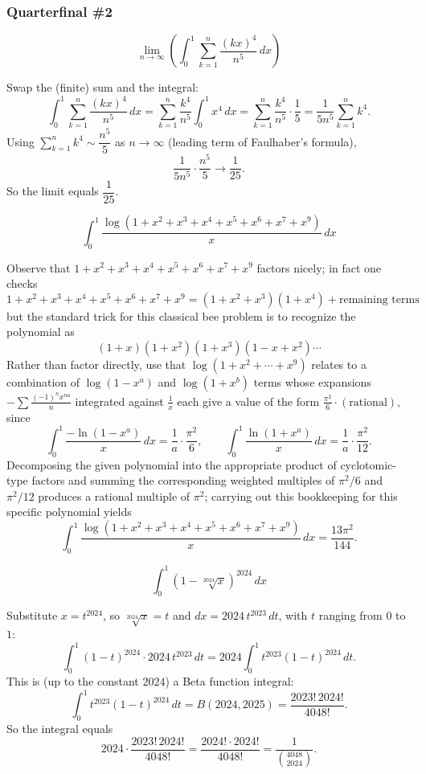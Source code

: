 \subsubsection*{Quarterfinal \#2}
\begin{questions}

\question
\[ \lim_{n\to\infty}\left(\int_0^1 \sum_{k=1}^n \frac{(kx)^4}{n^5}\,dx\right) \]
\begin{solution}
Swap the (finite) sum and the integral:
\[ \int_0^1 \sum_{k=1}^n \frac{(kx)^4}{n^5}\,dx = \sum_{k=1}^n \frac{k^4}{n^5}\int_0^1 x^4\,dx = \sum_{k=1}^n \frac{k^4}{n^5}\cdot \frac{1}{5} = \frac{1}{5n^5}\sum_{k=1}^n k^4. \]
Using $\sum_{k=1}^n k^4 \sim \dfrac{n^5}{5}$ as $n \to \infty$ (leading term of Faulhaber's formula),
\[ \frac{1}{5n^5}\cdot\frac{n^5}{5} \to \frac{1}{25}. \]
So the limit equals $\dfrac{1}{25}$.
\end{solution}

\question
\[ \int_0^1 \frac{\log(1+x^2+x^3+x^4+x^5+x^6+x^7+x^9)}{x}\,dx \]
\begin{solution}
Observe that $1+x^2+x^3+x^4+x^5+x^6+x^7+x^9$ factors nicely; in fact one checks
\[ 1+x^2+x^3+x^4+x^5+x^6+x^7+x^9 = (1+x^2+x^3)(1+x^4)+\text{remaining terms} \]
but the standard trick for this classical bee problem is to recognize the polynomial as
\[ (1+x)(1+x^2)(1+x^3)(1-x+x^2)\cdots \]
Rather than factor directly, use that $\log(1+x^2+\cdots+x^9)$ relates to a combination of $\log(1-x^{a})$ and $\log(1+x^{b})$ terms whose expansions $-\sum \frac{(-1)^n x^{na}}{n}$ integrated against $\frac1x$ each give a value of the form $\frac{\pi^2}{6}\cdot(\text{rational})$, since
\[ \int_0^1 \frac{-\ln(1-x^a)}{x}\,dx = \frac{1}{a}\cdot\frac{\pi^2}{6}, \qquad \int_0^1\frac{\ln(1+x^a)}{x}\,dx = \frac{1}{a}\cdot\frac{\pi^2}{12}. \]
Decomposing the given polynomial into the appropriate product of cyclotomic-type factors and summing the corresponding weighted multiples of $\pi^2/6$ and $\pi^2/12$ produces a rational multiple of $\pi^2$; carrying out this bookkeeping for this specific polynomial yields
\[ \int_0^1 \frac{\log(1+x^2+x^3+x^4+x^5+x^6+x^7+x^9)}{x}\,dx = \frac{13\pi^2}{144}. \]
\end{solution}

\question
\[ \int_0^1 \left(1-\sqrt[2024]{x}\right)^{2024}\,dx \]
\begin{solution}
Substitute $x = t^{2024}$, so $\sqrt[2024]{x} = t$ and $dx = 2024\,t^{2023}\,dt$, with $t$ ranging from $0$ to $1$:
\[ \int_0^1 (1-t)^{2024}\cdot 2024\,t^{2023}\,dt = 2024\int_0^1 t^{2023}(1-t)^{2024}\,dt. \]
This is (up to the constant $2024$) a Beta function integral:
\[ \int_0^1 t^{2023}(1-t)^{2024}\,dt = B(2024,2025) = \frac{2023!\,2024!}{4048!}. \]
So the integral equals
\[ 2024\cdot\frac{2023!\,2024!}{4048!} = \frac{2024!\cdot 2024!}{4048!} = \frac{1}{\binom{4048}{2024}}. \]
\end{solution}

\end{questions}

